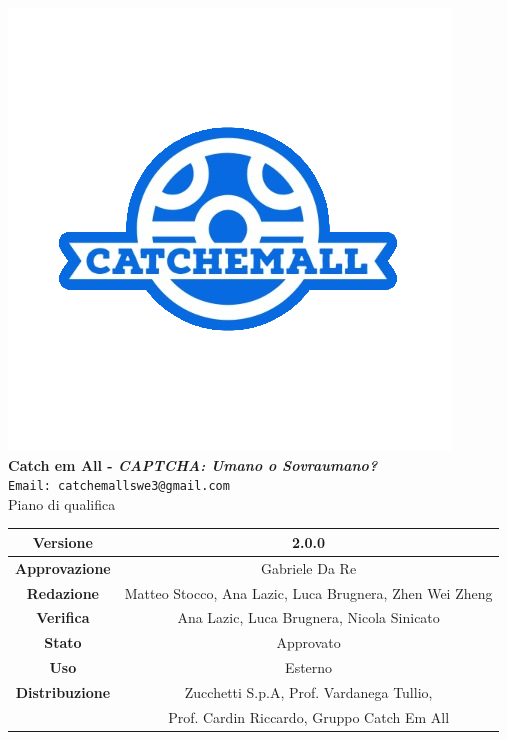 \begin{titlepage}
\begin{center}
	\includegraphics[scale = 1.5]{img/logo.png}\\
	\bigskip
	\large \textbf{Catch em All - \textit{CAPTCHA: Umano o Sovraumano?}}\\
	\texttt{Email: catchemallswe3@gmail.com}\\
	\vfill
	{\fontsize{1.5cm}{0}\selectfont Piano di qualifica}\\
	\vfill
	\setlength\extrarowheight{5pt}
	\begin{tabularx}{\textwidth}{| c | c |}
		\hline
		\textbf{Versione} & 2.0.0\\
		\hline
		\textbf{Approvazione} & Gabriele Da Re\\
		\hline
		\textbf{Redazione} & Matteo Stocco, Ana Lazic, Luca Brugnera, Zhen Wei Zheng\\
		\hline
		\textbf{Verifica} & Ana Lazic, Luca Brugnera, Nicola Sinicato\\
		\hline
		\textbf{Stato} & Approvato\\
		\hline
		\textbf{Uso} & Esterno\\
		\hline
		\textbf{Distribuzione} & Zucchetti S.p.A, Prof. Vardanega Tullio,\\
		& Prof. Cardin Riccardo, Gruppo Catch Em All\\
		\hline
	\end{tabularx}
\end{center}
\end{titlepage}
